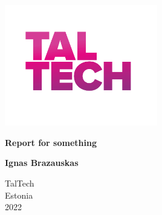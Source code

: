 \begin{titlepage}
    \begin{center}
        
        
        \includegraphics[width=0.5\textwidth]{pictures/TalTech_Gradient.png}
        \vspace*{1cm}
        
        {
            \Large 
            \textbf{Report for something}
        }

        \vspace{1.5cm}
        {
            \large
            \textbf{Ignas Brazauskas} \\
        }
        \vfill


        \vspace{0.8cm}

        

        TalTech\\
        Estonia\\
        2022

    \end{center}
\end{titlepage}